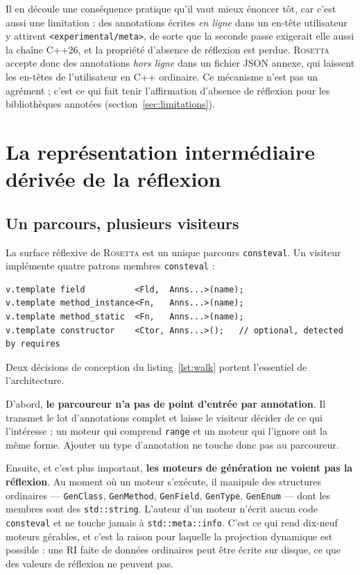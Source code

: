 \documentclass[11pt,a4paper]{article}
\newcommand{\rosetta}{\textsc{Rosetta}}
\newcommand{\code}[1]{\texttt{\small #1}}
\begin{document}
Il en découle une conséquence pratique qu'il vaut mieux énoncer tôt, car c'est
aussi une limitation : des annotations écrites \emph{en ligne} dans un en-tête
utilisateur y attirent \code{<experimental/meta>}, de sorte que la seconde passe
exigerait elle aussi la chaîne C++26, et la propriété d'absence de réflexion est
perdue. \rosetta{} accepte donc des annotations \emph{hors ligne} dans un
fichier JSON annexe, qui laissent les en-têtes de l'utilisateur en C++ ordinaire.
Ce mécanisme n'est pas un agrément ; c'est ce qui fait tenir l'affirmation
d'absence de réflexion pour les bibliothèques annotées
(section~\ref{sec:limitations}).

\section{La représentation intermédiaire dérivée de la réflexion}
\label{sec:ir}

\subsection{Un parcours, plusieurs visiteurs}

La surface réflexive de \rosetta{} est un unique parcours \code{consteval}. Un
visiteur implémente quatre patrons membres \code{consteval} :

\begin{lstlisting}[caption={Le concept de visiteur au complet. \code{Fld}/\code{Fn} sont des paramètres de patron non-type \code{std::meta::info} ; \code{Anns...} est le lot complet d'annotations du membre.},label={lst:walk}]
v.template field          <Fld,  Anns...>(name);
v.template method_instance<Fn,   Anns...>(name);
v.template method_static  <Fn,   Anns...>(name);
v.template constructor    <Ctor, Anns...>();   // optional, detected by requires
\end{lstlisting}

Deux décisions de conception du listing~\ref{lst:walk} portent l'essentiel de
l'architecture.

D'abord, \textbf{le parcoureur n'a pas de point d'entrée par annotation}. Il
transmet le lot d'annotations complet et laisse le visiteur décider de ce qui
l'intéresse ; un moteur qui comprend \code{range} et un moteur qui l'ignore ont
la même forme. Ajouter un type d'annotation ne touche donc pas au parcoureur.

Ensuite, et c'est plus important, \textbf{les moteurs de génération ne voient pas
la réflexion}. Au moment où un moteur s'exécute, il manipule des structures
ordinaires --- \code{GenClass}, \code{GenMethod}, \code{GenField},
\code{GenType}, \code{GenEnum} --- dont les membres sont des
\code{std::string}. L'auteur d'un moteur n'écrit aucun code \code{consteval} et
ne touche jamais à \code{std::meta::info}. C'est ce qui rend dix-neuf moteurs
gérables, et c'est la raison pour laquelle la projection dynamique est possible :
une RI faite de données ordinaires peut être écrite sur disque, ce que des
valeurs de réflexion ne peuvent pas.
\end{document}
